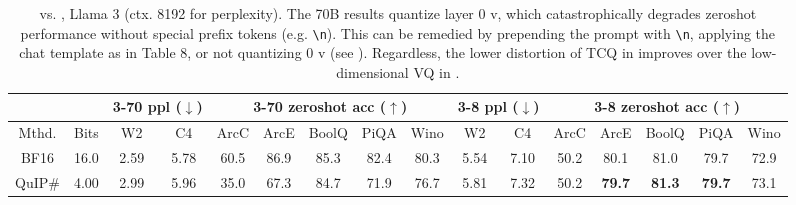 \begin{table}[t]
\caption{\qts vs. \qs, Llama 3 (ctx. 8192 for perplexity). The 70B results quantize layer 0 v, which catastrophically degrades zeroshot performance without special prefix tokens (e.g. \texttt{\textbackslash n}). This can be remedied by prepending the prompt with \texttt{\textbackslash n}, applying the chat template as in Table 8, or not quantizing 0 v (see \cite{yaqa}). Regardless, the lower distortion of TCQ in \qts improves over the low-dimensional VQ in \qs.}
\small\sc
\tabcolsep=0.09cm
\centering
\begin{tabular}{@{}cccccccccccccccc@{}}
\multicolumn{1}{l}{} & \multicolumn{1}{l}{}                              & \multicolumn{2}{c}{3-70 ppl ($\downarrow$)}                                & \multicolumn{5}{c}{3-70 zeroshot acc ($\uparrow$)}                                                                        & \multicolumn{2}{c}{3-8 ppl ($\downarrow$)}                                 & \multicolumn{5}{c}{3-8 zeroshot acc ($\uparrow$)}                            \\ \midrule
Mthd.               & \multicolumn{1}{c|}{Bits}                         & W2            & \multicolumn{1}{c|}{C4}                                    & \scriptsize ArcC          & \scriptsize ArcE          & \scriptsize BoolQ         & \scriptsize PiQA          & \multicolumn{1}{c|}{\scriptsize Wino}                                  & W2            & \multicolumn{1}{c|}{C4}                                    & \scriptsize ArcC          & \scriptsize ArcE          & \scriptsize BoolQ         & \scriptsize PiQA          & \scriptsize Wino          \\ \midrule
BF16                 & \multicolumn{1}{c|}{16.0}                         & 2.59          & \multicolumn{1}{c|}{5.78}                                  & 60.5          & 86.9          & 85.3          & 82.4          & \multicolumn{1}{c|}{80.3}                                  & 5.54          & \multicolumn{1}{c|}{7.10}                                  & 50.2          & 80.1          & 81.0          & 79.7          & 72.9          \\
\rowcolor[HTML]{D9D9D9} 
QuIP\#               & \multicolumn{1}{c|}{\cellcolor[HTML]{D9D9D9}4.00} & 2.99          & \multicolumn{1}{c|}{\cellcolor[HTML]{D9D9D9}5.96}          & 35.0          & 67.3          & 84.7          & 71.9          & \multicolumn{1}{c|}{\cellcolor[HTML]{D9D9D9}76.7}          & 5.81          & \multicolumn{1}{c|}{\cellcolor[HTML]{D9D9D9}7.32}          & 50.2          & \textbf{79.7} & \textbf{81.3} & \textbf{79.7} & 73.1          \\

\end{tabular}
\end{table}

